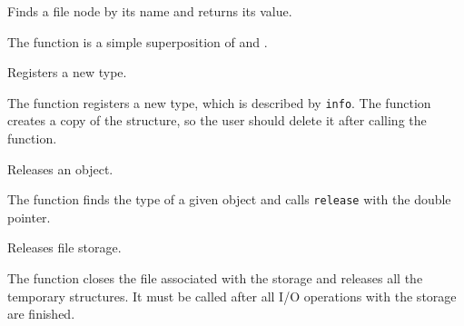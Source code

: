 Finds a file node by its name and returns its value.


\begin{description}
\end{description}

The function is a simple superposition of  and .

Registers a new type.


\begin{description}
\end{description}

The function registers a new type, which is
described by \texttt{info}. The function creates a copy of the structure,
so the user should delete it after calling the function.

Releases an object.


\begin{description}
\end{description}

The function finds the type of a given object and calls \texttt{release} with the double pointer.

Releases file storage.


\begin{description}
\end{description}


The function closes the file associated with the storage and releases all the temporary structures. It must be called after all I/O operations with the storage are finished.

